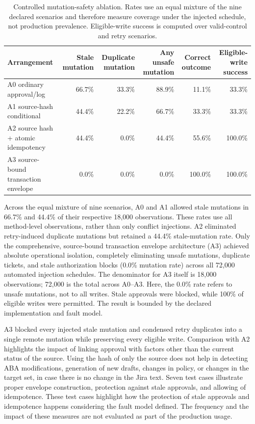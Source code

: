 \documentclass[manuscript,review]{acmart}
\begin{document}
\FloatBarrier
\begin{table}[htbp]
\centering
\small
\caption{Controlled mutation-safety ablation. Rates use an equal mixture of the nine declared scenarios and therefore measure coverage under the injected schedule, not production prevalence. Eligible-write success is computed over valid-control and retry scenarios.}
\label{tab:mutation-safety-ablation}
\begin{tabularx}{\textwidth}{@{}Xrrrrr@{}}
\toprule
Arrangement & Stale mutation & Duplicate mutation & Any unsafe mutation & Correct outcome & Eligible-write success \\
\midrule
A0 ordinary approval/log & 66.7\% & 33.3\% & 88.9\% & 11.1\% & 33.3\% \\
A1 source-hash conditional & 44.4\% & 22.2\% & 66.7\% & 33.3\% & 33.3\% \\
A2 source hash + atomic idempotency & 44.4\% & 0.0\% & 44.4\% & 55.6\% & 100.0\% \\
A3 source-bound transaction envelope & 0.0\% & 0.0\% & 0.0\% & 100.0\% & 100.0\% \\
\bottomrule
\end{tabularx}
\end{table}

Across the equal mixture of nine scenarios, A0 and A1 allowed stale mutations in 66.7\% and 44.4\% of their respective 18,000 observations. These rates use all method-level observations, rather than only conflict injections. A2 eliminated retry-induced duplicate mutations but retained a 44.4\% stale-mutation rate. Only the comprehensive, source-bound transaction envelope architecture (A3) achieved absolute operational isolation, completely eliminating unsafe mutations, duplicate tickets, and stale authorization blocks (0.0\% mutation rate) across all 72,000 automated injection schedules. The denominator for A3 itself is 18,000 observations; 72,000 is the total across A0--A3. Here, the 0.0\% rate refers to unsafe mutations, not to all writes. Stale approvals were blocked, while 100\% of eligible writes were permitted. The result is bounded by the declared implementation and fault model.

A3 blocked every injected stale mutation and condensed retry duplicates into a single remote mutation while preserving every eligible write. Comparison with A2 highlights the impact of linking approval with factors other than the current status of the source. Using the hash of only the source does not help in detecting ABA modifications, generation of new drafts, changes in policy, or changes in the target set, in case there is no change in the Jira text. Seven test cases illustrate proper envelope construction, protection against stale approvals, and allowing of idempotence. These test cases highlight how the protection of stale approvals and idempotence happens considering the fault model defined. The frequency and the impact of these measures are not evaluated as part of the production usage.
\end{document}
